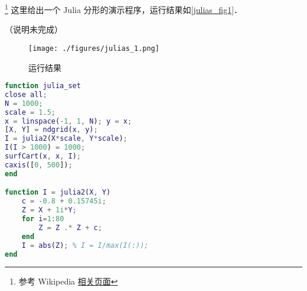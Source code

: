 
\footnote{参考 Wikipedia \href{https://en.wikipedia.org/wiki/Julia_set}{相关页面}} 这里给出一个 Julia 分形的演示程序，运行结果如\autoref{julias_fig1}．

（说明未完成）

\begin{figure}[ht]
\centering
\texttt{[image: ./figures/julias\_1.png]}
\caption{运行结果} \label{julias_fig1}
\end{figure}

\begin{lstlisting}[language=matlab]
function julia_set
close all;
N = 1000;
scale = 1.5;
x = linspace(-1, 1, N); y = x;
[X, Y] = ndgrid(x, y);
I = julia2(X*scale, Y*scale);
I(I > 1000) = 1000;
surfCart(x, x, I);
caxis([0, 500]);
end

function I = julia2(X, Y)
    c = -0.8 + 0.15745i;
    Z = X + 1i*Y;
    for i=1:80
        Z = Z .* Z + c;
    end
    I = abs(Z); % I = I/max(I(:));
end
\end{lstlisting}
